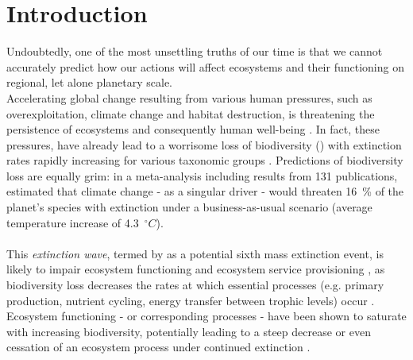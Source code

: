 \chapter{Introduction}
\label{chap:intro}
Undoubtedly, one of the most unsettling truths of our time is that we cannot accurately predict how our actions will affect ecosystems and their functioning on regional, let alone planetary scale.\\
Accelerating global change resulting from various human pressures, such as overexploitation, climate change and habitat destruction, is threatening the persistence of ecosystems and consequently human well-being \citep{MEA2005, Hooper2012}. In fact, these pressures, have already lead to a worrisome loss of biodiversity ()
with extinction rates rapidly increasing for various taxonomic groups \citep{Dirzo2003,Wake2008}.
Predictions of biodiversity loss are equally grim: in a meta-analysis including results from 131 publications, \cite{Urban2015} estimated that climate change - as a singular driver - would threaten 16~\% of the planet's species with extinction under a business-as-usual scenario (average temperature increase of 4.3~$^{\circ}C$). 
\\\\
%
 This \emph{extinction wave}, termed by \cite{Barnosky2011} as a potential sixth mass extinction event, is likely to impair ecosystem functioning and ecosystem service provisioning \citep{MEA2005,Naeem2012}, as
biodiversity loss decreases the rates at which essential processes (e.g. primary production, nutrient cycling, energy transfer between trophic levels) occur \citep[][]{Cardinale2012, Hooper2012}. \\
Ecosystem functioning - or corresponding processes - have been shown to saturate with increasing biodiversity, potentially leading to a steep decrease or even cessation of an ecosystem process under continued extinction \citep{Cardinale2012,Tilman2014}. 
